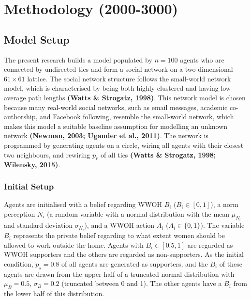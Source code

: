\documentclass[
  11pt,
]{article}
\begin{document}
\hypertarget{methodology-2000-3000}{%
\section{Methodology (2000-3000)}\label{methodology-2000-3000}}

\hypertarget{model-setup}{%
\subsection{Model Setup}\label{model-setup}}

The present research builds a model populated by \(n = 100\) agents who
are connected by undirected ties and form a social network on a
two-dimensional \(61 \times 61\) lattice. The social network structure
follows the small-world network model, which is characterised by being
both highly clustered and having low average path lengths \textbf{(Watts
\& Strogatz, 1998)}. This network model is chosen because many
real-world social networks, such as email messages, academic
co-authorship, and Facebook following, resemble the small-world network,
which makes this model a suitable baseline assumption for modelling an
unknown network \textbf{(Newman, 2003; Ugander et al., 2011)}. The
network is programmed by generating agents on a circle, wiring all
agents with their closest two neighbours, and rewiring \(p_r\) of all
ties \textbf{(Watts \& Strogatz, 1998; Wilensky, 2015)}.

\hypertarget{initial-setup}{%
\subsubsection{Initial Setup}\label{initial-setup}}

Agents are initialised with a belief regarding WWOH \(B_i\)
(\(B_i \in [0, 1]\)), a norm perception \(N_i\) (a random variable with
a normal distribution with the mean \(\mu_{N_i}\) and standard deviation
\(\sigma_{N_i}\)), and a WWOH action \(A_i\) (\(A_i \in \{0, 1\}\)). The
variable \(B_i\) represents the private belief regarding to what extent
women should be allowed to work outside the home. Agents with
\(B_i \in [0.5, 1]\) are regarded as WWOH supporters and the others are
regarded as non-supporters. As the initial condition, \(p_s = 0.8\) of
all agents are generated as supporters, and the \(B_i\) of these agents
are drawn from the upper half of a truncated normal distribution with
\(\mu_B = 0.5\), \(\sigma_B = 0.2\) (truncated between 0 and 1). The
other agents have a \(B_i\) from the lower half of this distribution.
\end{document}
